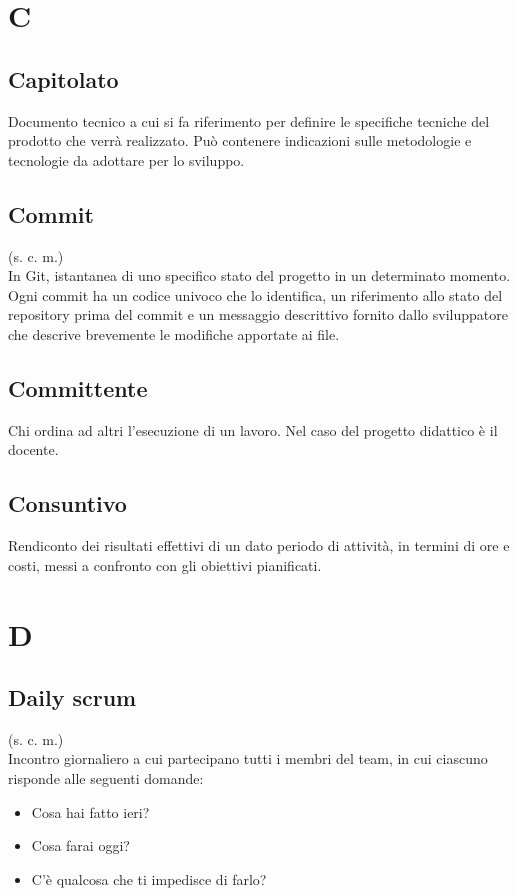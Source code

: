 \section{C}
    \subsection{Capitolato}
    Documento tecnico a cui si fa riferimento per definire le specifiche tecniche 
    del prodotto che verrà realizzato. Può contenere indicazioni sulle metodologie e
    tecnologie da adottare per lo sviluppo.
    \subsection{Commit}
    (s. c. m.)\\
    In Git, istantanea di uno specifico stato del progetto in un determinato momento.
    Ogni commit ha un codice univoco che lo identifica,
    un riferimento allo stato del repository prima del commit e un messaggio descrittivo 
    fornito dallo sviluppatore che descrive brevemente le modifiche apportate ai file.
    \subsection{Committente}
    Chi ordina ad altri l'esecuzione di un lavoro. Nel caso del progetto didattico
    è il docente.
    \subsection{Consuntivo}
    Rendiconto dei risultati effettivi di un dato periodo di attività, 
    in termini di ore e costi, messi a confronto con gli obiettivi pianificati.
\pagebreak
\section{D}
    \subsection{Daily scrum}
    (s. c. m.)\\
    Incontro giornaliero a cui partecipano tutti i membri del team, in cui ciascuno
    risponde alle seguenti domande:
    \begin{itemize}
        \item Cosa hai fatto ieri?
        \item Cosa farai oggi?
        \item C'è qualcosa che ti impedisce di farlo?
    \end{itemize}
